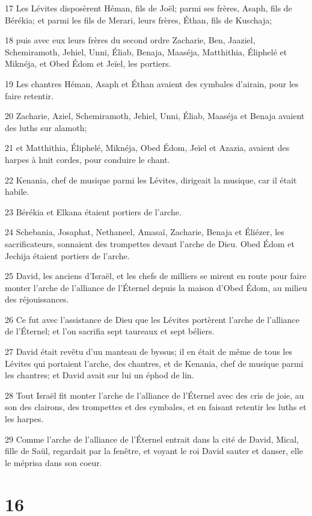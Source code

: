 \par 17 Les Lévites disposèrent Héman, fils de Joël; parmi ses frères, Asaph, fils de Bérékia; et parmi les fils de Merari, leurs frères, Éthan, fils de Kuschaja;
\par 18 puis avec eux leurs frères du second ordre Zacharie, Ben, Jaaziel, Schemiramoth, Jehiel, Unni, Éliab, Benaja, Maaséja, Matthithia, Éliphelé et Miknéja, et Obed Édom et Jeïel, les portiers.
\par 19 Les chantres Héman, Asaph et Éthan avaient des cymbales d'airain, pour les faire retentir.
\par 20 Zacharie, Aziel, Schemiramoth, Jehiel, Unni, Éliab, Maaséja et Benaja avaient des luths sur alamoth;
\par 21 et Matthithia, Éliphelé, Miknéja, Obed Édom, Jeïel et Azazia, avaient des harpes à huit cordes, pour conduire le chant.
\par 22 Kenania, chef de musique parmi les Lévites, dirigeait la musique, car il était habile.
\par 23 Bérékia et Elkana étaient portiers de l'arche.
\par 24 Schebania, Josaphat, Nethaneel, Amasaï, Zacharie, Benaja et Éliézer, les sacrificateurs, sonnaient des trompettes devant l'arche de Dieu. Obed Édom et Jechija étaient portiers de l'arche.
\par 25 David, les anciens d'Israël, et les chefs de milliers se mirent en route pour faire monter l'arche de l'alliance de l'Éternel depuis la maison d'Obed Édom, au milieu des réjouissances.
\par 26 Ce fut avec l'assistance de Dieu que les Lévites portèrent l'arche de l'alliance de l'Éternel; et l'on sacrifia sept taureaux et sept béliers.
\par 27 David était revêtu d'un manteau de byssus; il en était de même de tous les Lévites qui portaient l'arche, des chantres, et de Kenania, chef de musique parmi les chantres; et David avait sur lui un éphod de lin.
\par 28 Tout Israël fit monter l'arche de l'alliance de l'Éternel avec des cris de joie, au son des clairons, des trompettes et des cymbales, et en faisant retentir les luths et les harpes.
\par 29 Comme l'arche de l'alliance de l'Éternel entrait dans la cité de David, Mical, fille de Saül, regardait par la fenêtre, et voyant le roi David sauter et danser, elle le méprisa dans son coeur.

\chapter{16}

